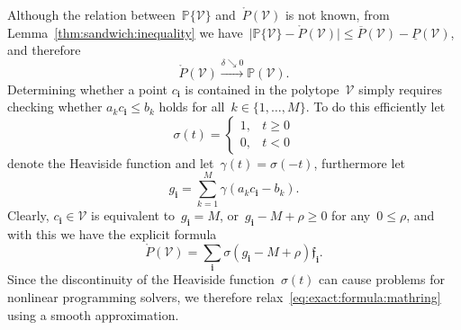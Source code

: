 \documentclass[letterpaper, 10pt, conference]{ieeeconf} %
\providecommand{\bfa}[1]{\mathbf{#1}}
\begin{document}
%
Although the relation between~$\mathbb P\{\mathcal V\}$ and~$\mathring{P}(\mathcal V)$ is not known, from Lemma~\ref{thm:sandwich:inequality} we have~$\lvert\mathbb P\{\mathcal V\}-\mathring{P}(\mathcal V)\rvert \leq \overline{P}(\mathcal V)-\underline{P}(\mathcal V)$, and therefore
\[
\mathring{P}(\mathcal V)\xrightarrow{\delta\searrow0}\mathbb{P}(\mathcal V).
\]
%
Determining whether a point $c_\bfa{i}$ is contained in the polytope~$\mathcal V$ simply requires checking whether 
$a_k c_\bfa{i}\leq b_k$ holds for all~$k\in\{1,\dots,M\}$.
%
To do this efficiently let
\[
\sigma(t)=\begin{cases} 1, & t\geq0 \\
0, & t<0
\end{cases}
\]
denote the Heaviside function and let~$\gamma(t) = \sigma(-t)$, furthermore let
%
\begin{equation}
	g_\bfa{i} = \sum_{k=1}^M\gamma(a_k c_\bfa{i}-b_k).
\end{equation}
%
Clearly, $c_\bfa{i}\in\mathcal V$ is equivalent to~$g_\bfa{i}=M$, or~$g_\bfa{i}-M+\rho\geq0$ for any~$0\leq\rho$, and with this we have the explicit formula
%
\begin{equation}\label{eq:exact:formula:mathring}
	\mathring{P}(\mathcal V) = \sum_{\bfa{i}}\sigma(g_\bfa{i}-M+\rho)\mathfrak f_\bfa{i}.
\end{equation}
%
Since the discontinuity of the Heaviside function~$\sigma(t)$ can cause problems for nonlinear programming solvers, we therefore relax~\eqref{eq:exact:formula:mathring} using a smooth approximation.
%
\end{document}
